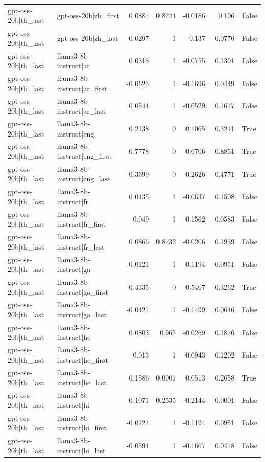 \begin{table}
\begin{tabular}{l l r r r r l}
gpt-oss-20b|th_last & gpt-oss-20b|zh_first & 0.0887 & 0.8244 & -0.0186 & 0.196 & False \\
gpt-oss-20b|th_last & gpt-oss-20b|zh_last & -0.0297 & 1 & -0.137 & 0.0776 & False \\
gpt-oss-20b|th_last & llama3-8b-instruct|ar & 0.0318 & 1 & -0.0755 & 0.1391 & False \\
gpt-oss-20b|th_last & llama3-8b-instruct|ar_first & -0.0623 & 1 & -0.1696 & 0.0449 & False \\
gpt-oss-20b|th_last & llama3-8b-instruct|ar_last & 0.0544 & 1 & -0.0529 & 0.1617 & False \\
gpt-oss-20b|th_last & llama3-8b-instruct|eng & 0.2138 & 0 & 0.1065 & 0.3211 & True \\
gpt-oss-20b|th_last & llama3-8b-instruct|eng_first & 0.7778 & 0 & 0.6706 & 0.8851 & True \\
gpt-oss-20b|th_last & llama3-8b-instruct|eng_last & 0.3699 & 0 & 0.2626 & 0.4771 & True \\
gpt-oss-20b|th_last & llama3-8b-instruct|fr & 0.0435 & 1 & -0.0637 & 0.1508 & False \\
gpt-oss-20b|th_last & llama3-8b-instruct|fr_first & -0.049 & 1 & -0.1562 & 0.0583 & False \\
gpt-oss-20b|th_last & llama3-8b-instruct|fr_last & 0.0866 & 0.8732 & -0.0206 & 0.1939 & False \\
gpt-oss-20b|th_last & llama3-8b-instruct|ga & -0.0121 & 1 & -0.1194 & 0.0951 & False \\
gpt-oss-20b|th_last & llama3-8b-instruct|ga_first & -0.4335 & 0 & -0.5407 & -0.3262 & True \\
gpt-oss-20b|th_last & llama3-8b-instruct|ga_last & -0.0427 & 1 & -0.1499 & 0.0646 & False \\
gpt-oss-20b|th_last & llama3-8b-instruct|he & 0.0803 & 0.965 & -0.0269 & 0.1876 & False \\
gpt-oss-20b|th_last & llama3-8b-instruct|he_first & 0.013 & 1 & -0.0943 & 0.1202 & False \\
gpt-oss-20b|th_last & llama3-8b-instruct|he_last & 0.1586 & 0.0001 & 0.0513 & 0.2658 & True \\
gpt-oss-20b|th_last & llama3-8b-instruct|hi & -0.1071 & 0.2535 & -0.2144 & 0.0001 & False \\
gpt-oss-20b|th_last & llama3-8b-instruct|hi_first & -0.0121 & 1 & -0.1194 & 0.0951 & False \\
gpt-oss-20b|th_last & llama3-8b-instruct|hi_last & -0.0594 & 1 & -0.1667 & 0.0478 & False \\

\end{tabular}
\end{table}
